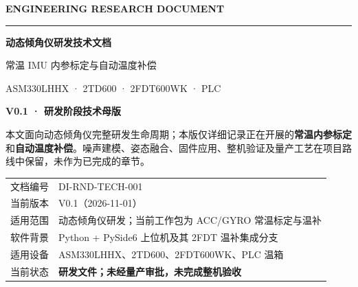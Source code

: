 \begin{titlepage}
\thispagestyle{empty}
\vspace*{13mm}
{\sffamily\bfseries\color{teal}\Large ENGINEERING RESEARCH DOCUMENT}\par
\vspace{5mm}\noindent\color{teal}\rule{46mm}{2pt}\par
\vspace{20mm}
{\sffamily\bfseries\color{navy}\fontsize{30}{43}\selectfont
动态倾角仪研发技术文档\par}
\vspace{8mm}
{\LARGE\sffamily\color{blue}常温 IMU 内参标定与自动温度补偿}\par
\vspace{6mm}
{\large\sffamily\color{muted}ASM330LHHX · 2TD600 · 2FDT600WK · PLC}\par
\vspace{14mm}
\begin{notice}
\textbf{V0.1 · 研发阶段技术母版}\par
本文面向动态倾角仪完整研发生命周期；本版仅详细记录正在开展的\textbf{常温内参标定}和\textbf{自动温度补偿}。噪声建模、姿态融合、固件应用、整机验证及量产工艺在项目路线中保留，未作为已完成的章节。
\end{notice}
\vfill
\noindent\begin{tabularx}{\linewidth}{@{}p{33mm}Y@{}}\toprule
文档编号 & DI-RND-TECH-001\\
当前版本 & V0.1（2026-11-01）\\
适用范围 & 动态倾角仪研发；当前工作包为 ACC/GYRO 常温标定与温补\\
软件背景 & Python + PySide6 上位机及其 2FDT 温补集成分支\\
适用设备 & ASM330LHHX、2TD600、2FDT600WK、PLC 温箱\\
当前状态 & \textbf{研发文件；未经量产审批，未完成整机验收}\\\bottomrule
\end{tabularx}
\end{titlepage}
